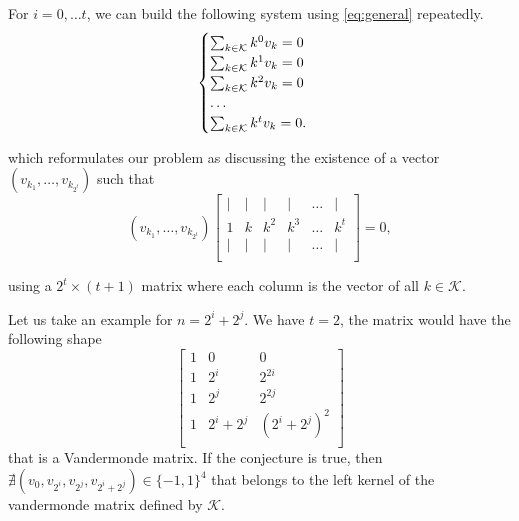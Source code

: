 For $i = 0, \ldots t$, we can build the following system using \cref{eq:general} repeatedly.
\begin{equation}
    \begin{cases}
        \sum_{k \in \mathcal{K}} k^0v_k = 0\\
        \sum_{k \in \mathcal{K}} k^1v_k = 0\\
        \sum_{k \in \mathcal{K}} k^2v_k = 0\\
        \ldots\\
        \sum_{k \in \mathcal{K}} k^tv_k = 0.\\
    \end{cases}
\end{equation}

which reformulates our problem as discussing the existence of a vector $(v_{k_1}, \ldots, v_{k_{2^t}})$ such that
$$
(v_{k_1}, \ldots, v_{k_{2^t}})
\begin{bmatrix}
    | & | & | & | & \ldots & |\\
    1 & k & k^2 & k^3 & \ldots & k^t\\
    | & | & | & | & \ldots & |\\
\end{bmatrix} = 0,
$$

using a  $2^t \times (t + 1)$ matrix where each column is the vector of all $k \in \mathcal{K}$.

Let us take an example for $n = 2^i + 2^j$. We have $t = 2$, the matrix would have the following shape
$$
\begin{bmatrix}
    1 & 0 & 0\\
    1 & 2^i & 2^{2i}\\
    1 & 2^j & 2^{2j}\\
    1 & 2^i + 2^j & (2^i + 2^j)^2\\
\end{bmatrix}
$$
that is a Vandermonde matrix. If the conjecture is true, then $\nexists (v_0, v_{2^i}, v_{2^j}, v_{2^i + 2^j}) \in \{-1, 1\}^4$ that belongs to the left kernel of the vandermonde matrix defined by $\mathcal{K}$.
